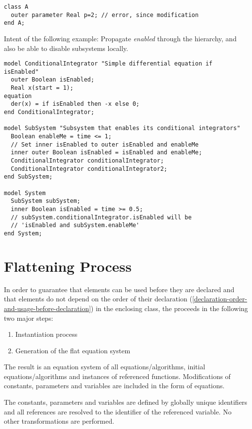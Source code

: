 \begin{example}
\begin{lstlisting}[language=modelica]
class A
  outer parameter Real p=2; // error, since modification
end A;
\end{lstlisting}

Intent of the following example: Propagate \emph{enabled} through the hierarchy, and also be able to disable subsystems locally.
\begin{lstlisting}[language=modelica]
model ConditionalIntegrator "Simple differential equation if isEnabled"
  outer Boolean isEnabled;
  Real x(start = 1);
equation
  der(x) = if isEnabled then -x else 0;
end ConditionalIntegrator;

model SubSystem "Subsystem that enables its conditional integrators"
  Boolean enableMe = time <= 1;
  // Set inner isEnabled to outer isEnabled and enableMe
  inner outer Boolean isEnabled = isEnabled and enableMe;
  ConditionalIntegrator conditionalIntegrator;
  ConditionalIntegrator conditionalIntegrator2;
end SubSystem;

model System
  SubSystem subSystem;
  inner Boolean isEnabled = time >= 0.5;
  // subSystem.conditionalIntegrator.isEnabled will be
  // 'isEnabled and subSystem.enableMe'
end System;
\end{lstlisting}
\end{example}


\section{Flattening Process}\label{flattening-process}

In order to guarantee that elements can be used before they are declared and that elements do not depend on the order of their declaration (\cref{declaration-order-and-usage-before-declaration}) in the enclosing class, the  proceeds in the following two major steps:
\begin{enumerate}
\item
  Instantiation process
\item
  Generation of the flat equation system
\end{enumerate}

The result is an equation system of all equations/algorithms, initial equations/algorithms and instances of referenced functions.
Modifications of constants, parameters and variables are included in the form of equations.

The constants, parameters and variables are defined by globally unique identifiers and all references are resolved to the identifier of the referenced variable.
No other transformations are performed.


